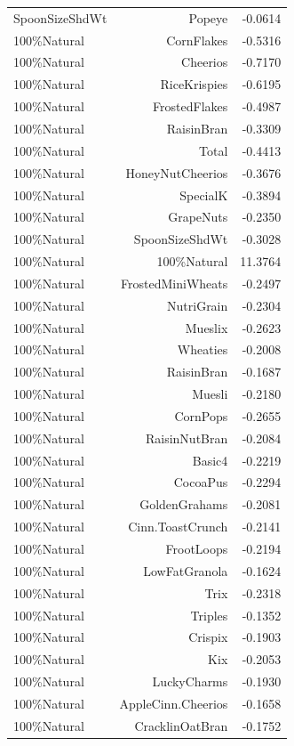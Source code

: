 \begin{longtable}{@{}lrr@{}}
SpoonSizeShdWt & Popeye & -0.0614 \\
100\%Natural & CornFlakes & -0.5316 \\
100\%Natural & Cheerios & -0.7170 \\
100\%Natural & RiceKrispies & -0.6195 \\
100\%Natural & FrostedFlakes & -0.4987 \\
100\%Natural & RaisinBran & -0.3309 \\
100\%Natural & Total & -0.4413 \\
100\%Natural & HoneyNutCheerios & -0.3676 \\
100\%Natural & SpecialK & -0.3894 \\
100\%Natural & GrapeNuts & -0.2350 \\
100\%Natural & SpoonSizeShdWt & -0.3028 \\
100\%Natural & 100\%Natural & 11.3764 \\
100\%Natural & FrostedMiniWheats & -0.2497 \\
100\%Natural & NutriGrain & -0.2304 \\
100\%Natural & Mueslix & -0.2623 \\
100\%Natural & Wheaties & -0.2008 \\
100\%Natural & RaisinBran & -0.1687 \\
100\%Natural & Muesli & -0.2180 \\
100\%Natural & CornPops & -0.2655 \\
100\%Natural & RaisinNutBran & -0.2084 \\
100\%Natural & Basic4 & -0.2219 \\
100\%Natural & CocoaPus & -0.2294 \\
100\%Natural & GoldenGrahams & -0.2081 \\
100\%Natural & Cinn.ToastCrunch & -0.2141 \\
100\%Natural & FrootLoops & -0.2194 \\
100\%Natural & LowFatGranola & -0.1624 \\
100\%Natural & Trix & -0.2318 \\
100\%Natural & Triples & -0.1352 \\
100\%Natural & Crispix & -0.1903 \\
100\%Natural & Kix & -0.2053 \\
100\%Natural & LuckyCharms & -0.1930 \\
100\%Natural & AppleCinn.Cheerios & -0.1658 \\
100\%Natural & CracklinOatBran & -0.1752 \\

\end{longtable}
